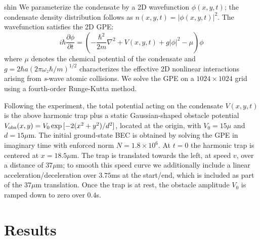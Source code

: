 \begin{chapter}{\label{cha:shin}shin}
We parameterize the condensate by a 2D wavefunction $\phi(x,y,t)$; the condensate density distribution follows as $n(x,y,t)=|\phi(x,y,t)|^2$.  The wavefunction satisfies the 2D GPE:
\begin{equation}
  i\hbar \frac{\partial \phi}{\partial t} = \left(- \frac{\hbar^2}{2m} \nabla ^2  + V(x,y,t) + g |\phi|^2 - \mu \right) \phi
\label{eq:GPE}
\end{equation}
where $\mu$ denotes the chemical potential of the condensate and $g=2 \hbar a (2 \pi \omega_z \hbar/m)^{1/2}$ characterizes the effective 2D nonlinear interactions arising from {\it s}-wave atomic collisions. We solve the GPE on a $1024 \times 1024$ grid using a fourth-order Runge-Kutta method.   

Following the experiment, the total potential acting on the condensate $V(x,y,t)$ is the above harmonic trap plus a static Gaussian-shaped obstacle potential $V_{\rm{obs}}(x,y) = V_0 \exp{[-{2(x^2 + y^2)}/{d^2}]}$, located at the origin, with $V_0=15 \mu$ and $d=15\mu$m.  The initial ground-state BEC is obtained by solving the GPE in imaginary time with enforced norm $N=1.8\times 10^6$.  At $t=0$ the harmonic trap is centered at $x=18.5\mu$m. The trap is translated towards the left, at speed $v$, over a distance of $37 \mu$m; to smooth this speed curve we additionally include a linear acceleration/deceleration over $3.75$ms at the start/end, which is included as part of the $37\mu$m translation.  Once the trap is at rest, the obstacle amplitude $V_0$ is ramped down to zero over $0.4$s.

\section{Results}

\end{chapter}
